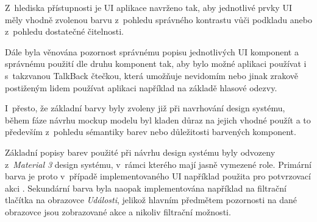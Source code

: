 \begin{minipage}[t]{0.45\textwidth}

\bigskip
{}
Z~hlediska přístupnosti je UI aplikace navrženo tak, aby jednotlivé prvky UI měly vhodně zvolenou barvu z~pohledu
správného kontrastu vůči podkladu anebo z~pohledu dostatečné čitelnosti.

Dále byla věnována pozornost správnému popisu jednotlivých UI komponent a správnému použití dle druhu komponent tak, aby bylo možné aplikaci používat i
s~takzvanou TalkBack čtečkou, která umožňuje nevidomím nebo jinak zrakově postiženým lidem používat aplikaci například na základě hlasové odezvy.

\bigskip
{}
I~přesto, že základní barvy byly zvoleny již při navrhování design systému, během fáze návrhu mockup modelu byl kladen důraz na jejich 
vhodné použít a to především z~pohledu sémantiky barev nebo důležitosti barvených komponent.


Základní popisy barev použité při návrhu design systému byly odvozeny z~\textit{Material 3} design systému, v~rámci kterého mají jasně 
vymezené role. \cite{m3ColorRoles}
Primární barva je proto v~případě implementovaného UI například použita pro potvrzovací akci . 
Sekundární barva byla naopak
implementována například na filtrační tlačítka na obrazovce \textit{Události}, jelikož hlavním předmětem pozornosti na dané obrazovce 
jsou zobrazované akce a nikoliv filtrační možnosti.

\bigskip



\end{minipage}
\hfill
